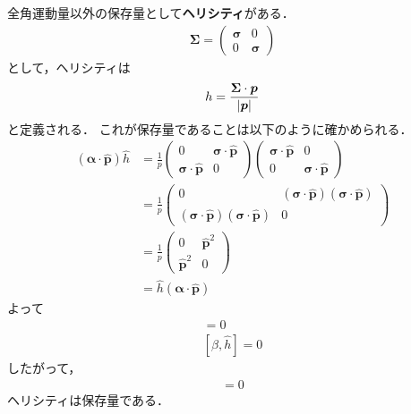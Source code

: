 \documentclass{report}
\begin{document}
  全角運動量以外の保存量として\textbf{ヘリシティ}がある．
  \begin{align}
    \bm{\Sigma} = 
    \begin{pmatrix}
      \bm{\sigma} & 0\\
      0 & \bm{\sigma}
    \end{pmatrix}
  \end{align}
  として，ヘリシティは
  \begin{align}
    h = \frac{\bm{\Sigma} \cdot \bm{p}}{\abs{\bm{p}}}
  \end{align}
  と定義される．
  これが保存量であることは以下のように確かめられる．
  \begin{align}
    (\bm{\alpha} \cdot \hat{\bm{p}}) \hat{h} &= \frac{1}{p}
    \begin{pmatrix}
      0 & \bm{\sigma} \cdot \hat{\bm{p}}\\
      \bm{\sigma} \cdot \hat{\bm{p}} & 0
    \end{pmatrix}
    \begin{pmatrix}
      \bm{\sigma} \cdot \hat{\bm{p}} & 0\\
      0 & \bm{\sigma} \cdot \hat{\bm{p}}
    \end{pmatrix}\\
    &= \frac{1}{p}
    \begin{pmatrix}
      0 & (\bm{\sigma} \cdot \hat{\bm{p}})(\bm{\sigma} \cdot \hat{\bm{p}})\\
      (\bm{\sigma} \cdot \hat{\bm{p}})(\bm{\sigma} \cdot \hat{\bm{p}}) & 0
    \end{pmatrix}\\
    &=\frac{1}{p}
    \begin{pmatrix}
      0 & \hat{\bm{p}}^2\\
      \hat{\bm{p}}^2 & 0
    \end{pmatrix}\\
    &= \hat{h}(\bm{\alpha}\cdot \hat{\bm{p}})
  \end{align}
  よって
  \begin{align}
    [\bm{\alpha} \cdot \hat{\bm{p}}, \hat{h}] = 0\\
    [\beta, \hat{h}] = 0
  \end{align}
  したがって，
  \begin{align}
    [\hat{H}, \hat{h}] = 0
  \end{align}
  ヘリシティは保存量である．
\end{document}

